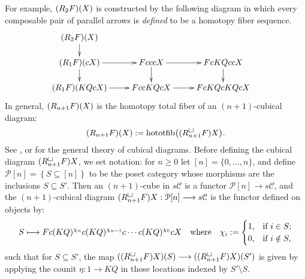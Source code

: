 \documentclass[11pt]{amsart} \renewcommand{\baselinestretch}{1.2}
\theoremstyle{plain}
\numberwithin{equation}{section} %
\theoremstyle{plain}
\numberwithin{equation}{chapter} %
\renewcommand{\to}{\longrightarrow}
\newcommand{\calP}{\mathcal{P}}
\newcommand{\calc}{\mathcal{C}}
\newcommand{\algcat}{{\calc}}%
\renewcommand{\mapsto}{\longmapsto}
\newcommand{\dupdown}[2]{R_{\smash{#1}}}
\newcommand{\plainD}{R}
\newcommand{\SubsectionOrSection}[1]{\subsection{#1}}
\begin{document}
\begin{Bousfield-Kan spectral sequence}
For example, $(\dupdown{2}{c}F)(X)$ is constructed by the following diagram in which every composable pair of parallel arrows is \emph{defined} to be a homotopy fiber sequence.
\[\def\labelstyle{\scriptstyle}
\xymatrix@!0@R=30pt@C=43pt{
(\dupdown{2}{c}F)(X)\ar[d]\\
(\dupdown{1}{c}F)(cX) \ar[rr]\ar[d]         &           &FcccX \ar[rr]\ar[d]         &           &   FcKQccX            \ar[d]  &                  \\
(\dupdown{1}{c}F)(KQcX) \ar[rr] &                     &  FccKQcX \ar[rr] &             & FcKQcKQcX
}\]
In general, $(\dupdown{n+1}{c}F)(X)$ is the homotopy total fiber of an $(n+1)$-cubical diagram:
\[(\dupdown{n+1}{c}F)(X):=\textup{hototfib} \bigl(({\plainD}_{n+1}^{\smash{\square}}F)X\bigr).\]
See \cite{GoodwillieCalcII}, \cite{LuisGoodwillie.pdf} or \cite{CubicalHomotopyTheory.pdf} for the general theory of cubical diagrams. Before defining the cubical diagram $({\plainD}_{n+1}^{\smash{\square}}F)X$, we set notation: for $n\geq0$ let $[n]=\{0,\ldots,n\}$, and define $\calP[n]=\left\{S\subseteq [n]\right\}$ to be the poset category whose morphisms are the inclusions $S\subseteq S'$. Then an $(n+1)$-cube in $s\algcat$ is a functor $\calP[n]\to s\algcat$, and the $(n+1)$-cubical diagram $({\plainD}_{n+1}^{\smash{\square}}F)X:\calP[n]\to s\algcat$ is the functor defined on objects by:
\[S\mapsto Fc(KQ)^{\chi_{n}}c(KQ)^{\chi_{n-1}}c\cdots c(KQ)^{\chi_0}cX\quad \textup{where}\quad \chi_i:=\begin{cases}
1,&\textup{if }i\in S;\\
0,&\textup{if }i\notin S,
\end{cases}
\]
such that for $S\subseteq S'$, the map $(({\plainD}_{n+1}^{\smash{\square}}F)X)(S)\to (({\plainD}_{n+1}^{\smash{\square}}F)X)(S')$ is given by applying the counit $\eta:1\to KQ$ in those locations indexed by $S'\setminus S$.



\end{Bousfield-Kan spectral sequence}
\end{document}
